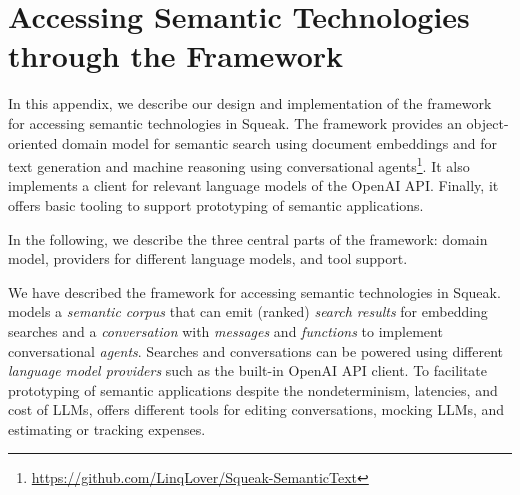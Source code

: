
\chapter{Accessing Semantic Technologies through the \semtex Framework}
\label{apx:semtex}

In this appendix, we describe our design and implementation of the \semtex framework for accessing semantic technologies in Squeak.
The \semtex framework provides an object-oriented domain model for semantic search using document embeddings and for text generation and machine reasoning using conversational agents\footnote{\url{https://github.com/LinqLover/Squeak-SemanticText}}.
It also implements a client for relevant language models of the OpenAI API.
Finally, it offers basic tooling to support prototyping of semantic applications.

In the following, we describe the three central parts of the framework: domain model, providers for different language models, and tool support.


\begin{summary}
	We have described the \semtex framework for accessing semantic technologies in Squeak.
	\semtex models a \emph{semantic corpus} that can emit (ranked) \emph{search results} for embedding searches and a \emph{conversation} with \emph{messages} and \emph{functions} to implement conversational \emph{agents}.
	Searches and conversations can be powered using different \emph{language model providers} such as the built-in OpenAI API client.
	To facilitate prototyping of semantic applications despite the nondeterminism, latencies, and cost of LLMs, \semtex offers different tools for editing conversations, mocking LLMs, and estimating or tracking expenses.
\end{summary}
